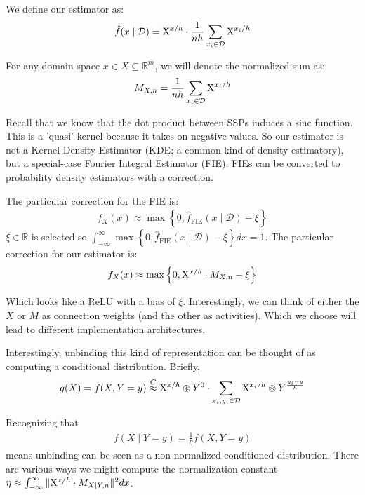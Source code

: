 \documentclass[10pt,letterpaper,oneside]{article}
\newcommand{\bind}{\circledast}
\newcommand{\analog}{\overset{C}{\approx}}
\newcommand{\ssp}[1]{\mathrm{\uppercase{#1}}^{\lowercase{#1}/h}}
\newcommand{\sspi}[2]{\mathrm{\uppercase{#1}}^{\lowercase{#1}_{#2}/h}}
\begin{document}
We define our estimator as: 
\begin{align}
  \hat{f}(x\mid \mathcal{D}) = \ssp{x}\cdot \frac{1}{nh}\sum_{x_{i} \in \mathcal{D}} \sspi{x}{i}
\end{align} 

For any domain space $x \in X \subseteq \mathbb{R}^{m}$, we will denote the normalized sum as:
\begin{align}
M_{X,n} = \frac{1}{nh}\sum_{x_{i} \in \mathcal{D}}\sspi{x}{i}
\end{align}

Recall that we know that the dot product between SSPs induces a sinc function.  This is a 'quasi'-kernel because it takes on negative values. So our estimator is not a Kernel Density Estimator (KDE; a common kind of density estimatory), but a special-case Fourier Integral Estimator (FIE). FIEs can be converted to probability density estimators with a correction.

The particular correction for the FIE is:
\begin{align}
  f_{X}(x) \approx \max\left\{0,\hat{f}_\mathrm{FIE}\left(x \mid \mathcal{D}\right)-\xi\right\}
\end{align}
$\xi\in \mathbb{R}$ is selected so $\int_{-\infty}^{\infty}\max\left\{0,\hat{f}_\mathrm{FIE}\left(x \mid \mathcal{D}\right)-\xi\right\}dx = 1$. The particular correction for our estimator is: 
\begin{align}
  f_{X}(x) \approx \max\left\{0,\ssp{x}\cdot M_{X,n} - \xi\right\}
\end{align}

Which looks like a ReLU with a bias of $\xi$. Interestingly, we can think of either the $X$ or $M$ as connection weights (and the other as activities). Which we choose will lead to different implementation architectures.

Interestingly, unbinding this kind of representation can be thought of as computing a conditional distribution.  Briefly, 
\begin{align}
  g(X) = f(X,Y=y) \analog \ssp{x}\bind Y^{0}\cdot \sum_{x_i,y_i \in \mathcal{D}} \sspi{x}{i}\bind Y^{\frac{y_{i}-y}{h}}
\end{align}

Recognizing that 
\begin{align}
  f(X\mid Y=y) = \frac{1}{\eta}f(X,Y=y)
\end{align}
means unbinding can be seen as a non-normalized conditioned distribution. There are various ways we might compute the normalization constant $\eta \approx \int_{-\infty}^{\infty}\|\ssp{X}\cdot M_{X\mid Y,n}\|^{2} dx$.
\end{document}
